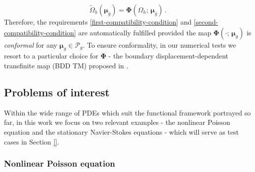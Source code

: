 \documentclass{elsarticle}
\theoremstyle{theorem}
\theoremstyle{definition}
\theoremstyle{remark}
\theoremstyle{proposition}
\numberwithin{figure}{section}
\newcommand{\wt}[1]{\widetilde{#1}}
\newcommand{\bg}[1]{\boldsymbol{#1}}
\begin{document}
		\begin{equation*}
			\label{eq:parametrized-map-discrete}
			\wt{\Omega}_h(\bg{\mu}_g) = \bg{\Phi}(\Omega_h; \, \bg{\mu}_g) \, .
		\end{equation*}
		Therefore, the requirements \ref{first-compatibility-condition} and \ref{second-compatibility-condition} are automatically fulfilled provided the map $\bg{\Phi}(\cdot; \, \bg{\mu}_g)$ is \emph{conformal} for any $\bg{\mu}_g \in \mathcal{P}_g$. To ensure conformality, in our numerical tests we resort to a particular choice for $\bg{\Phi}$ - the boundary displacement-dependent transfinite map (BDD TM) proposed in \cite{JIR14}.
		
		
		
	\subsection{Problems of interest}
	\label{section:Problems of interest}
	
		Within the wide range of PDEs which suit the functional framework portrayed so far, in this work we focus on two relevant examples - the nonlinear Poisson equation and the stationary Navier-Stokes equations - which will serve as test cases in Section \ref{}.
		
		
		
	\subsubsection{Nonlinear Poisson equation}
	\label{section:Nonlinear Poisson equation}
	
\end{document}
